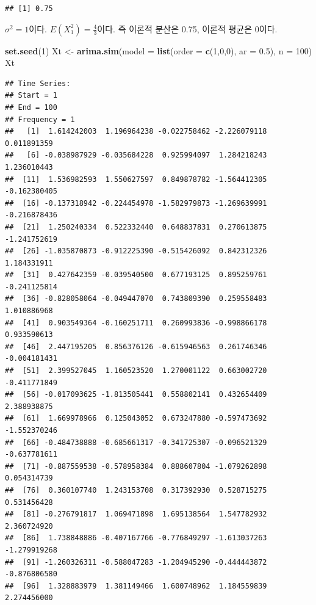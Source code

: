 \documentclass[
]{article}
\newenvironment{Shaded}{\begin{snugshade}}{\end{snugshade}}
\newcommand{\AttributeTok}[1]{\textcolor[rgb]{0.13,0.29,0.53}{#1}}
\newcommand{\DecValTok}[1]{\textcolor[rgb]{0.00,0.00,0.81}{#1}}
\newcommand{\FloatTok}[1]{\textcolor[rgb]{0.00,0.00,0.81}{#1}}
\newcommand{\FunctionTok}[1]{\textcolor[rgb]{0.13,0.29,0.53}{\textbf{#1}}}
\newcommand{\NormalTok}[1]{#1}
\newcommand{\OtherTok}[1]{\textcolor[rgb]{0.56,0.35,0.01}{#1}}
\begin{document}
\begin{verbatim}
## [1] 0.75
\end{verbatim}

\(\sigma^2 = 1\)이다. \(E(X_1^2)= \frac{4}{3}\)이다. 즉 이론적 분산은
0.75, 이론적 평균은 0이다.

\begin{Shaded}
\begin{Highlighting}[]
\FunctionTok{set.seed}\NormalTok{(}\DecValTok{1}\NormalTok{)}
\NormalTok{Xt }\OtherTok{\textless{}{-}} \FunctionTok{arima.sim}\NormalTok{(}\AttributeTok{model =} \FunctionTok{list}\NormalTok{(}\AttributeTok{order =} \FunctionTok{c}\NormalTok{(}\DecValTok{1}\NormalTok{,}\DecValTok{0}\NormalTok{,}\DecValTok{0}\NormalTok{), }\AttributeTok{ar =} \FloatTok{0.5}\NormalTok{), }\AttributeTok{n =} \DecValTok{100}\NormalTok{)}
\NormalTok{Xt}
\end{Highlighting}
\end{Shaded}

\begin{verbatim}
## Time Series:
## Start = 1 
## End = 100 
## Frequency = 1 
##   [1]  1.614242003  1.196964238 -0.022758462 -2.226079118  0.011891359
##   [6] -0.038987929 -0.035684228  0.925994097  1.284218243  1.236010443
##  [11]  1.536982593  1.550627597  0.849878782 -1.564412305 -0.162380405
##  [16] -0.137318942 -0.224454978 -1.582979873 -1.269639991 -0.216878436
##  [21]  1.250240334  0.522332440  0.648837831  0.270613875 -1.241752619
##  [26] -1.035870873 -0.912225390 -0.515426092  0.842312326  1.184331911
##  [31]  0.427642359 -0.039540500  0.677193125  0.895259761 -0.241125814
##  [36] -0.828058064 -0.049447070  0.743809390  0.259558483  1.010886968
##  [41]  0.903549364 -0.160251711  0.260993836 -0.998866178  0.933590613
##  [46]  2.447195205  0.856376126 -0.615946563  0.261746346 -0.004181431
##  [51]  2.399527045  1.160523520  1.270001122  0.663002720 -0.411771849
##  [56] -0.017093625 -1.813505441  0.558802141  0.432654409  2.388938875
##  [61]  1.669978966  0.125043052  0.673247880 -0.597473692 -1.552370246
##  [66] -0.484738888 -0.685661317 -0.341725307 -0.096521329 -0.637781611
##  [71] -0.887559538 -0.578958384  0.888607804 -1.079262898  0.054314739
##  [76]  0.360107740  1.243153708  0.317392930  0.528715275  0.531456428
##  [81] -0.276791817  1.069471898  1.695138564  1.547782932  2.360724920
##  [86]  1.738848886 -0.407167766 -0.776849297 -1.613037263 -1.279919268
##  [91] -1.260326311 -0.588047283 -1.204945290 -0.444443872 -0.876806580
##  [96]  1.328883979  1.381149466  1.600748962  1.184559839  2.274456000
\end{verbatim}
\end{document}
